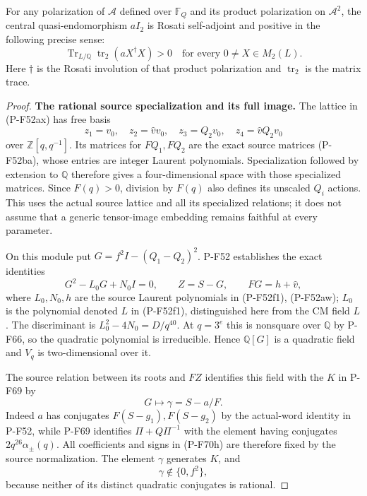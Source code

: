 \begin{proposition}
For any polarization of $\mathcal A$ defined over $\mathbb F_Q$
and its product polarization on $\mathcal A^2$, the central
quasi-endomorphism $aI_2$ is Rosati self-adjoint and positive
in the following precise sense:
\[
 \operatorname{Tr}_{L/\mathbb Q}
    \operatorname{tr}_2(a X^\dagger X)>0
                      \quad\text{for every }0\ne X\in M_2(L).
                                                               \tag{P-F70f}
\]
Here $\dagger$ is the Rosati involution of that product
polarization and $\operatorname{tr}_2$ is the matrix trace.
\end{proposition}

\begin{proof}
\par\medskip\noindent\textbf{The rational source specialization and its full image.}
The lattice in (P-F52ax) has free basis
\[
 z_1=v_0,\quad z_2=\widehat v v_0,\quad
 z_3=Q_2v_0,\quad z_4=\widehat v Q_2v_0
\]
over $\mathbb Z[q,q^{-1}]$.  Its matrices for $FQ_1,FQ_2$
are the exact source matrices (P-F52ba), whose entries are
integer Laurent polynomials.  Specialization followed by
extension to $\mathbb Q$ therefore gives a four-dimensional
space with those specialized matrices.  Since $F(q)>0$,
division by $F(q)$ also defines its unscaled $Q_i$ actions.
This uses the actual source lattice and all its specialized
relations; it does not assume that a generic tensor-image
embedding remains faithful at every parameter.

On this module put $G=f^2I-(Q_1-Q_2)^2$.  P-F52 establishes
the exact identities
\[
 G^2-L_0G+N_0I=0,\qquad
 Z=S-G,\qquad FG=h+\widehat v,                                \tag{P-F70g}
\]
where $L_0,N_0,h$ are the source Laurent polynomials in
(P-F52f1), (P-F52aw); $L_0$ is the polynomial denoted $L$
in (P-F52f1), distinguished here from the CM field $L$.
The discriminant is
$L_0^2-4N_0=D/q^{40}$.  At $q=3^e$ this is nonsquare
over $\mathbb Q$ by P-F66, so the quadratic polynomial
is irreducible.  Hence $\mathbb Q[G]$ is a quadratic
field and $V_q$ is two-dimensional over it.

The source relation between its roots and $FZ$ identifies
this field with the $K$ in P-F69 by
\[
                      G\longmapsto \gamma=S-a/F.
                                                               \tag{P-F70h}
\]
Indeed $a$ has conjugates $F(S-g_1),F(S-g_2)$ by the
actual-word identity in P-F52, while P-F69 identifies
$\Pi+Q\Pi^{-1}$ with the element having conjugates
$2q^{26}\alpha_\pm(q)$.  All coefficients and signs in
(P-F70h) are therefore fixed by the source normalization.
The element $\gamma$ generates $K$, and
\[
                    \gamma\notin\{0,f^2\},
                                                               \tag{P-F70i}
\]
because neither of its distinct quadratic conjugates is rational.


\end{proof}
